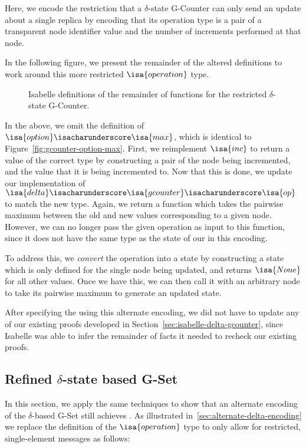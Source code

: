 Here, we encode the restriction that a $\delta$-state G-Counter can only send an
update about a single replica by encoding that its operation type is a pair of
a transparent node identifier value and the number of increments performed at
that node.

In the following figure, we present the remainder of the altered definitions to
work around this more restricted $\isa{operation}$ type.

\begin{figure}[H]
  
  \caption{Isabelle definitions of the remainder of functions for the restricted
    $\delta$-state G-Counter.}
\end{figure}

In the above, we omit the definition of
$\isa{option}\isacharunderscore\isa{max}$, which is identical to
Figure~\ref{fig:gcounter-option-max}. First, we reimplement $\isa{inc}$ to
return a value of the correct type by constructing a pair of the node being
incremented, and the value that it is being incremented to. Now that this is
done, we update our implementation of
$\isa{delta}\isacharunderscore\isa{gcounter}\isacharunderscore\isa{op}$ to match
the new type. Again, we return a function which takes the pairwise maximum
between the old and new values corresponding to a given node. However, we can no
longer pass the given operation as input to this function, since it does not
have the same type as the state of our \CRDT in this encoding.

To address this, we \emph{convert} the operation into a state by constructing a
state which is only defined for the single node being updated, and returns
$\isa{None}$ for all other values. Once we have this, we can then call it with
an arbitrary node to take its pairwise maximum to generate an updated state.

After specifying the \CRDT using this alternate encoding, we did not have to
update any of our existing proofs developed in
Section~\ref{sec:isabelle-delta-gcounter}, since Isabelle was able to infer the
remainder of facts it needed to recheck our existing proofs.

\subsection{Refined $\delta$-state based G-Set}

In this section, we apply the same techniques to show that an alternate encoding
of the $\delta$-based G-Set still achieves \SEC. As illustrated
in~\ref{sec:alternate-delta-encoding} we replace the definition of the
$\isa{operation}$ type to only allow for restricted, single-element messages
as follows:

